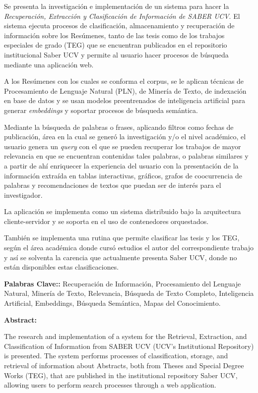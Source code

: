 Se presenta la investigación e implementación de un sistema para hacer la \emph{Recuperación, Extracción y Clasificación de Información de SABER UCV}. El sistema ejecuta procesos de clasificación, almacenamiento y recuperación de información sobre los Resúmenes, tanto de las tesis como de los trabajos especiales de grado (TEG) que se encuentran publicados en el repositorio institucional Saber UCV y permite al usuario hacer procesos de búsqueda mediante una aplicación web.

A los Resúmenes con los cuales se conforma el corpus, se le aplican técnicas de Procesamiento de Lenguaje Natural (PLN), de Minería de Texto, de indexación en base de datos y se usan modelos preentrenados de inteligencia artificial para generar \textit{embeddings} y soportar procesos de búsqueda semántica.

Mediante la búsqueda de palabras o frases, aplicando filtros como fechas de publicación, área en la cual se generó la investigación y/o el nivel académico, el usuario genera un \textit{query} con el que se pueden recuperar los trabajos de mayor relevancia en que se encuentran contenidas tales palabras, o palabras similares y a partir de ahí enriquecer la experiencia del usuario con la presentación de la información extraída en tablas interactivas, gráficos, grafos de coocurrencia de palabras y recomendaciones de textos que puedan ser de interés para el investigador.

La aplicación se implementa como un sistema distribuido bajo la arquitectura cliente-servidor y se soporta en el uso de contenedores orquestados.

También se implementa una rutina que permite clasificar las tesis y los TEG, según el área académica donde cursó estudios el autor del correspondiente trabajo y así se solventa la carencia que actualmente presenta Saber UCV, donde no están disponibles estas clasificaciones.

\vspace*{2cm}

\textbf{Palabras Clave::} Recuperación de Información, Procesamiento del Lenguaje Natural,  Minería de Texto, Relevancia, Búsqueda de Texto Completo, Inteligencia Artificial, Embeddings, Búsqueda Semántica, Mapas del Conocimiento.



\newpage
\thispagestyle{empty}
\large{\textbf{Abstract:}}

The research and implementation of a system for the Retrieval, Extraction, and Classification of Information from SABER UCV (UCV's Institutional Repository) is presented. The system performs processes of classification, storage, and retrieval of information about Abstracts, both from Theses and Special Degree Works (TEG), that are published in the institutional repository Saber UCV, allowing users to perform search processes through a web application.

